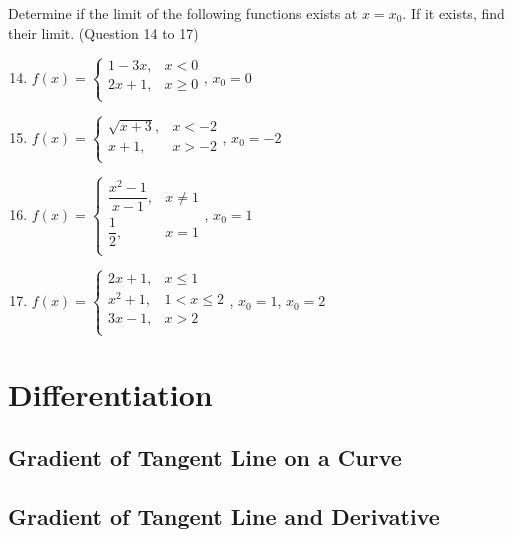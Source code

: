 \documentclass[12pt]{report}
\begin{document}
\begin{multicols}{2}
  \noindent Determine if the limit of the following functions exists at $x = x_0$. If it exists, find their limit. (Question 14 to 17)
  \begin{enumerate}
    \setcounter{enumi}{13}
    \item $f(x) = \left\{\begin{array}{rl}
              1-3x, & x < 0    \\
              2x+1, & x \geq 0 \\
            \end{array}\right.$, $x_0 = 0$
    \item $f(x) = \left\{\begin{array}{rl}
              \sqrt{x+3}, & x < -2 \\
              x+1,        & x > -2 \\
            \end{array}\right.$, $x_0 = -2$
    \item $f(x) = \left\{\begin{array}{rl}
              \dfrac{x^2 - 1}{x-1}, & x \neq 1 \\
              \dfrac{1}{2},         & x = 1    \\
            \end{array}\right.$, $x_0 = 1$
    \item $f(x) = \left\{\begin{array}{rl}
              2x + 1,  & x \leq 1     \\
              x^2 + 1, & 1 < x \leq 2 \\
              3x - 1,  & x > 2        \\
            \end{array}\right.$, $x_0 = 1$, $x_0 = 2$
  \end{enumerate}
\end{multicols}

\chapter{Differentiation}

\section{Gradient of Tangent Line on a Curve}

\section{Gradient of Tangent Line and Derivative}
\end{document}
